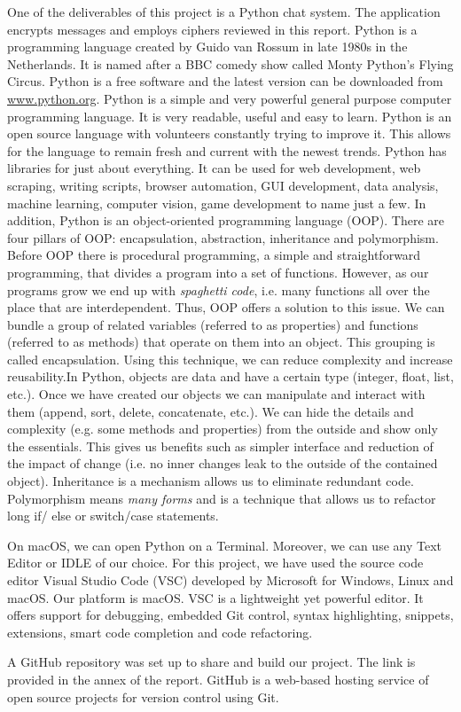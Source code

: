 One of the deliverables of this project is a Python chat system. The application encrypts messages and employs ciphers reviewed in this report. Python is a programming language created by Guido van Rossum in late 1980s in the Netherlands. It is named after a BBC comedy show called Monty Python's Flying Circus. Python is a free software and the latest version can be downloaded from \url{www.python.org}. Python is a simple and very powerful general purpose computer programming language. It is very readable, useful and easy to learn. Python is an open source language with volunteers constantly trying to improve it. This allows for the language to remain fresh and current with the newest trends. Python has libraries for just about everything. It can be used for web development, web scraping, writing scripts, browser automation, GUI development, data analysis, machine learning, computer vision, game development to name just a few. In addition, Python is an object-oriented programming language (OOP). There are four pillars of OOP: encapsulation, abstraction, inheritance and polymorphism. Before OOP there is procedural programming, a simple and straightforward programming, that divides a program into a set of functions. However, as our programs grow we end up with \emph{spaghetti code}, i.e. many functions all over the place that are interdependent. Thus, OOP offers a solution to this issue. We can bundle a group of related variables (referred to as properties) and functions (referred to as methods) that operate on them into an object. This grouping is called encapsulation. Using this technique, we can reduce complexity and increase reusability.In Python, objects are data and have a certain type (integer, float, list, etc.). Once we have created our objects we can manipulate and interact with them (append, sort, delete, concatenate, etc.). We can hide the details and complexity (e.g. some methods and properties) from the outside and show only the essentials. This gives us benefits such as simpler interface and reduction of the impact of change (i.e. no inner changes leak to the outside of the contained object). Inheritance is a mechanism allows us to eliminate redundant code. Polymorphism means \emph{many forms} and is a technique that allows us to refactor long if/ else or switch/case statements. 

On macOS, we can open Python on a Terminal. Moreover, we can use any Text Editor or IDLE of our choice. For this project, we have used the source code editor Visual Studio Code (VSC) developed by Microsoft for Windows, Linux and macOS. Our platform is macOS. VSC is a lightweight yet powerful editor. It offers support for debugging, embedded Git control, syntax highlighting, snippets, extensions, smart code completion and code refactoring. 

A GitHub repository was set up to share and build our project. The link is provided in the annex of the report. GitHub is a web-based hosting service of open source projects for version control using Git. 